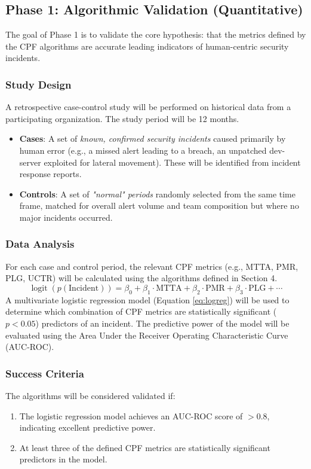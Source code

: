 \documentclass[11pt, a4paper]{article}
\DeclareMathOperator{\logit}{logit}
\begin{document}
\subsection{Phase 1: Algorithmic Validation (Quantitative)}
The goal of Phase 1 is to validate the core hypothesis: that the metrics defined by the CPF algorithms are accurate leading indicators of human-centric security incidents.

\subsubsection{Study Design}
A retrospective case-control study will be performed on historical data from a participating organization. The study period will be 12 months.
\begin{itemize}
    \item \textbf{Cases}: A set of \textit{known, confirmed security incidents} caused primarily by human error (e.g., a missed alert leading to a breach, an unpatched dev-server exploited for lateral movement). These will be identified from incident response reports.
    \item \textbf{Controls}: A set of \textit{"normal" periods} randomly selected from the same time frame, matched for overall alert volume and team composition but where no major incidents occurred.
\end{itemize}

\subsubsection{Data Analysis}
For each case and control period, the relevant CPF metrics (e.g., MTTA, PMR, PLG, UCTR) will be calculated using the algorithms defined in Section 4.
\begin{equation}
\label{eq:logreg}
\logit(p(\text{Incident})) = \beta_0 + \beta_1 \cdot \text{MTTA} + \beta_2 \cdot \text{PMR} + \beta_3 \cdot \text{PLG} + \cdots
\end{equation}
A multivariate logistic regression model (Equation \ref{eq:logreg}) will be used to determine which combination of CPF metrics are statistically significant ($p < 0.05$) predictors of an incident. The predictive power of the model will be evaluated using the Area Under the Receiver Operating Characteristic Curve (AUC-ROC).

\subsubsection{Success Criteria}
The algorithms will be considered validated if:
\begin{enumerate}
    \item The logistic regression model achieves an AUC-ROC score of $>0.8$, indicating excellent predictive power.
    \item At least three of the defined CPF metrics are statistically significant predictors in the model.
\end{enumerate}
\end{document}
